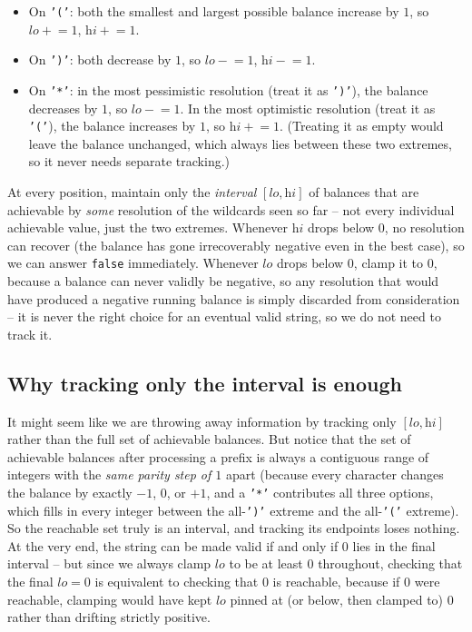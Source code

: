 \begin{itemize}
  \item On \texttt{'('}: both the smallest and largest possible balance
        increase by $1$, so $\textit{lo} \mathrel{+}= 1$,
        $\textit{hi} \mathrel{+}= 1$.
  \item On \texttt{')'}: both decrease by $1$, so
        $\textit{lo} \mathrel{-}= 1$, $\textit{hi} \mathrel{-}= 1$.
  \item On \texttt{'*'}: in the most pessimistic resolution (treat it as
        \texttt{')'}), the balance decreases by $1$, so
        $\textit{lo} \mathrel{-}= 1$. In the most optimistic resolution
        (treat it as \texttt{'('}), the balance increases by $1$, so
        $\textit{hi} \mathrel{+}= 1$. (Treating it as empty would leave the
        balance unchanged, which always lies between these two extremes, so
        it never needs separate tracking.)
\end{itemize}

\begin{ideabox}
At every position, maintain only the \emph{interval} $[\textit{lo},
\textit{hi}]$ of balances that are achievable by \emph{some} resolution of
the wildcards seen so far -- not every individual achievable value, just the
two extremes. Whenever $\textit{hi}$ drops below $0$, no resolution can
recover (the balance has gone irrecoverably negative even in the best case),
so we can answer \texttt{false} immediately. Whenever $\textit{lo}$ drops
below $0$, clamp it to $0$, because a balance can never validly be negative,
so any resolution that would have produced a negative running balance is
simply discarded from consideration -- it is never the right choice for an
eventual valid string, so we do not need to track it.
\end{ideabox}

\subsection*{Why tracking only the interval is enough}

It might seem like we are throwing away information by tracking only
$[\textit{lo}, \textit{hi}]$ rather than the full set of achievable balances.
But notice that the set of achievable balances after processing a prefix is
always a contiguous range of integers with the \emph{same parity step of
$1$} apart (because every character changes the balance by exactly $-1$,
$0$, or $+1$, and a \texttt{'*'} contributes all three options, which fills
in every integer between the all-\texttt{')'} extreme and the all-\texttt{'('}
extreme). So the reachable set truly is an interval, and tracking its
endpoints loses nothing. At the very end, the string can be made valid if
and only if $0$ lies in the final interval -- but since we always clamp
$\textit{lo}$ to be at least $0$ throughout, checking that the final
$\textit{lo} = 0$ is equivalent to checking that $0$ is reachable, because if
$0$ were reachable, clamping would have kept $\textit{lo}$ pinned at (or
below, then clamped to) $0$ rather than drifting strictly positive.

